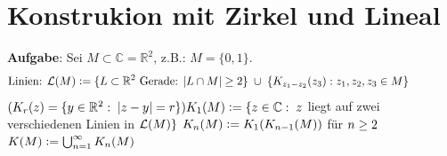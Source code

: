 \documentclass[a4paper,10pt,german]{scrbook}
\theoremstyle{saetze}
\theoremstyle{definitionen}
\begin{document}
\section{Konstrukion mit Zirkel und Lineal}

\textbf{Aufgabe}: Sei $M \subset \mathbb{C} = \mathbb{R}^2$, z.B.:
$M=\{0,1\}$.
\[\mbox{Linien: }\mathcal{L}(M) \mathrel{\mathop:}= \{L \subset \mathbb{R}^2 \mbox{ Gerade: }
|L \cap M| \geq 2\}\; \cup \;\{K_{z_1 - z_2}(z_3): z_1, z_2, z_3
\in M\}\qquad\qquad\] $(K_r(z) = \{y \in \mathbb{R}^2:\;|z-y| =
r\}) \\\\ K_1(M) \mathrel{\mathop:}= \{z \in \mathbb{C}:\; z$ liegt auf zwei
verschiedenen Linien in $\mathcal{L}(M)\}\\$ $K_n(M) \mathrel{\mathop:}=
K_1(K_{n-1}(M))$ für $n \geq 2\\$ $K(M) \mathrel{\mathop:}= \bigcup_{n=1}^\infty
K_n(M)$
\end{document}
